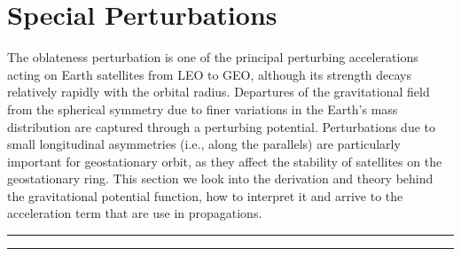 
\section{Special Perturbations}
The oblateness perturbation is one of the principal perturbing accelerations acting on Earth satellites from LEO to GEO, although its strength decays relatively rapidly with the orbital radius. Departures of the gravitational field from the spherical symmetry due to finer variations in the Earth's mass distribution are captured through a perturbing potential. Perturbations due to small longitudinal asymmetries (i.e., along the parallels) are particularly important for geostationary orbit, as they affect the stability of satellites on the geostationary ring. This section we look into the derivation and theory behind the gravitational potential function, how to interpret it and arrive to the acceleration term that are use in propagations. 
\vspace{0.3cm}
\hrule\vspace{0.1cm}
\hrule
\vspace{0.3cm}
